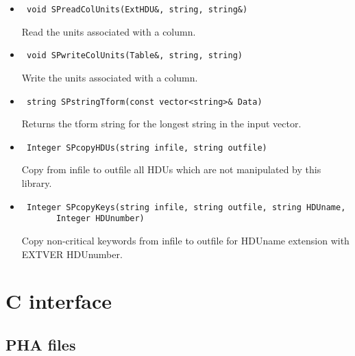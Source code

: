 \documentclass[11pt]{book}
\begin{document}
\begin{itemize}

\item  \begin{verbatim} void SPreadColUnits(ExtHDU&, string, string&) \end{verbatim}

          Read the units associated with a column.

\item  \begin{verbatim} void SPwriteColUnits(Table&, string, string) \end{verbatim}

          Write the units associated with a column.

\item  \begin{verbatim} string SPstringTform(const vector<string>& Data) \end{verbatim}

          Returns the tform string for the longest string in the input vector.

\item  \begin{verbatim} Integer SPcopyHDUs(string infile, string outfile) \end{verbatim}

          Copy from infile to outfile all HDUs which are not manipulated by this library. 

\item  \begin{verbatim} Integer SPcopyKeys(string infile, string outfile, string HDUname, 
       Integer HDUnumber) \end{verbatim}

          Copy non-critical keywords from infile to outfile for HDUname 
          extension with EXTVER HDUnumber.

\end{itemize}



\chapter{C interface}

\section{PHA files}
\end{document}
